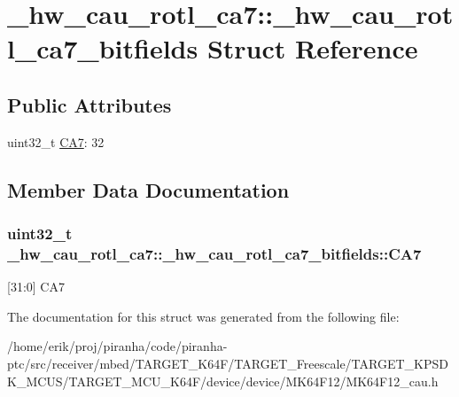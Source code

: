 \hypertarget{struct__hw__cau__rotl__ca7_1_1__hw__cau__rotl__ca7__bitfields}{}\section{\+\_\+hw\+\_\+cau\+\_\+rotl\+\_\+ca7\+:\+:\+\_\+hw\+\_\+cau\+\_\+rotl\+\_\+ca7\+\_\+bitfields Struct Reference}
\label{struct__hw__cau__rotl__ca7_1_1__hw__cau__rotl__ca7__bitfields}
\subsection*{Public Attributes}
\begin{DoxyCompactItemize}
\item 
uint32\+\_\+t \hyperlink{struct__hw__cau__rotl__ca7_1_1__hw__cau__rotl__ca7__bitfields_a1564db171d1a490d678274e1f4a4b5ac}{C\+A7}\+: 32
\end{DoxyCompactItemize}


\subsection{Member Data Documentation}
\subsubsection[{\texorpdfstring{C\+A7}{CA7}}]{\setlength{\rightskip}{0pt plus 5cm}uint32\+\_\+t \+\_\+hw\+\_\+cau\+\_\+rotl\+\_\+ca7\+::\+\_\+hw\+\_\+cau\+\_\+rotl\+\_\+ca7\+\_\+bitfields\+::\+C\+A7}\hypertarget{struct__hw__cau__rotl__ca7_1_1__hw__cau__rotl__ca7__bitfields_a1564db171d1a490d678274e1f4a4b5ac}{}\label{struct__hw__cau__rotl__ca7_1_1__hw__cau__rotl__ca7__bitfields_a1564db171d1a490d678274e1f4a4b5ac}
\mbox{[}31\+:0\mbox{]} C\+A7 

The documentation for this struct was generated from the following file\+:\begin{DoxyCompactItemize}
\item 
/home/erik/proj/piranha/code/piranha-\/ptc/src/receiver/mbed/\+T\+A\+R\+G\+E\+T\+\_\+\+K64\+F/\+T\+A\+R\+G\+E\+T\+\_\+\+Freescale/\+T\+A\+R\+G\+E\+T\+\_\+\+K\+P\+S\+D\+K\+\_\+\+M\+C\+U\+S/\+T\+A\+R\+G\+E\+T\+\_\+\+M\+C\+U\+\_\+\+K64\+F/device/device/\+M\+K64\+F12/M\+K64\+F12\+\_\+cau.\+h\end{DoxyCompactItemize}
